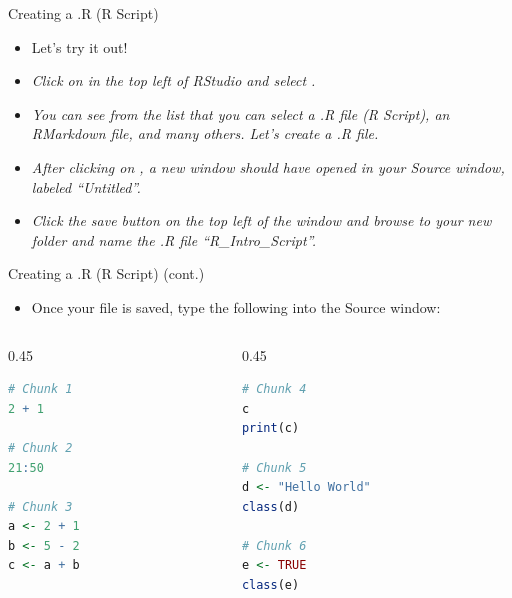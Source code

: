 \begin{frame}{Creating a .R (R Script)}
\begin{itemize}
  \item Let’s try it out!
  \item \textit{Click on  in the top left of RStudio and select .}
  \item \textit{You can see from the list that you can select a .R file (R Script), an RMarkdown file, and many others. Let’s create a .R file.}
  \item \textit{After clicking on , a new window should have opened in your Source window, labeled “Untitled”.}
  \item \textit{Click the save button on the top left of the window and browse to your new folder and name the .R file “R\_Intro\_Script”.}
\end{itemize}
\end{frame}

\begin{frame}[fragile]{Creating a .R (R Script) (cont.)}
\begin{itemize}
  \item Once your file is saved, type the following into the Source window:
\end{itemize}
\begin{columns}[T]
\begin{column}{0.45\textwidth}
\begin{lstlisting}[language=R]
# Chunk 1
2 + 1

# Chunk 2
21:50

# Chunk 3
a <- 2 + 1
b <- 5 - 2
c <- a + b
\end{lstlisting}
\end{column}
\begin{column}{0.45\textwidth}
\begin{lstlisting}[language=R]
# Chunk 4
c
print(c)

# Chunk 5
d <- "Hello World"
class(d)

# Chunk 6
e <- TRUE
class(e)
\end{lstlisting}
\end{column}
\end{columns}
\end{frame}

